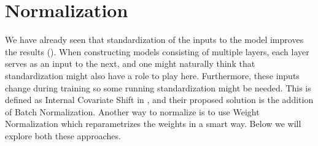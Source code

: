 \section{Normalization}
\label{sec:normal_model}
We have already seen that standardization of the inputs to the model improves the results (). 
When constructing models consisting of multiple layers, each layer serves as an input to the next, and one might naturally think that standardization might also have a role to play here.
Furthermore, these inputs change during training so some running standardization might be needed.
This is defined as Internal Covariate Shift in \cite{ioffeBatchNormalizationAccelerating2015a}, and their proposed solution is the addition of Batch Normalization.
Another way to normalize is to use Weight Normalization \cite{salimansWeightNormalizationSimple2016} which reparametrizes the weights in a smart way.
Below we will explore both these approaches.
